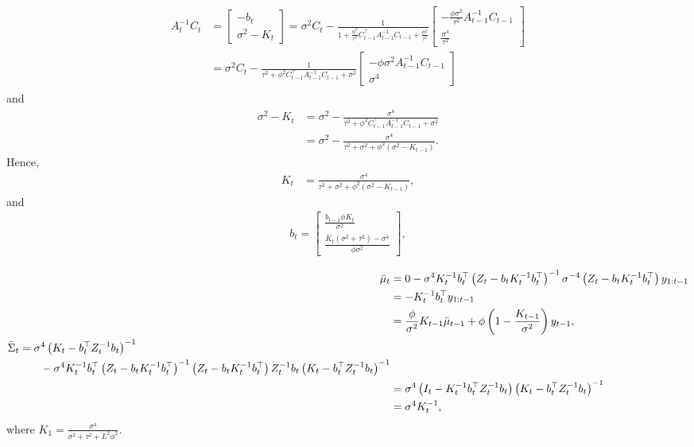 \begin{align}
\begin{split}
A_{t}^{-1}C_{t} &= \left[ \begin{array}{c} -b_{t} \\ \sigma^2-K_{t}\end{array} \right] = \sigma^2C_{t}-\frac{1}{1+\frac{\phi^2}{\tau^2} C_{t-1}^\top A_{t-1}^{-1}C_{t-1}+\frac{\sigma^2}{\tau^2}} \left[\begin{array}{c} -\frac{\phi\sigma^2}{\tau^2} A_{t-1}^{-1}C_{t-1} \\\frac{\sigma^4}{\tau^2} \end{array}\right] \\
&= \sigma^2C_{t}-\frac{1}{\tau^2+\phi^2C_{t-1}^\top A_{t-1}^{-1}C_{t-1}+\sigma^2} \left[\begin{array}{c} -\phi\sigma^2 A_{t-1}^{-1}C_{t-1} \\ \sigma^4 \end{array}\right]
\end{split}
\end{align}
and
\begin{align*}
\sigma^2-K_{t} &= \sigma^2 - \frac{\sigma^4}{\tau^2+\phi^2C_{t-1}^\top A_{t-1}^{-1}C_{t-1}+\sigma^2} \\
&= \sigma^2 - \frac{\sigma^4}{\tau^2+ \sigma^2 + \phi^2\left(\sigma^2-K_{t-1}\right)}.
\end{align*}
Hence, 
\begin{align}
K_{t}  &=\frac{\sigma^4}{\tau^2+\sigma^2+\phi^2\left(\sigma^2-K_{t-1}\right)},
\end{align}
and
\begin{align*}b_{t} = 
\begin{bmatrix}
\frac{b_{t-1}\phi K_{t}}{\sigma^2} \\ \frac{K_{t}\left(\sigma^2+\tau^2\right)-\sigma^4 }{\phi\sigma^2}
\end{bmatrix},
\end{align*}

\begin{align*}
\bar{\mu}_{t}      &= 0-\sigma^4 K_t^{-1}b_t^\top \left(Z_t-b_tK_t^{-1}b_t^\top\right)^{-1} \sigma^{-4} \left(Z_t-b_tK_t^{-1}b_t^\top\right) y_{1:t-1} \\
					 & =-K_t^{-1}b_t^\top y_{1:t-1} \\
					 & = \frac{\phi}{\sigma^2}K_{t-1}\bar{\mu}_{t-1} + \phi \left(1 - \frac{K_{t-1}}{\sigma^2}\right)y_{t-1}, \\
\begin{split}
\bar{\Sigma}_{t} &= \sigma^4\left(K_t-b_t^\top Z_t^{-1}b_t\right)^{-1}\\ 
&\hphantom{+t-} - \sigma^4K_t^{-1}b_t^\top \left(Z_t-b_tK_t^{-1}b_t^\top\right)^{-1} 
 \left(Z_t-b_tK_t^{-1}b_t^\top\right)Z_t^{-1}b_t\left(K_t-b_t^\top Z_t^{-1}b_t\right)^{-1}
\end{split}
\\  & = \sigma^4\left(I_t-K_t^{-1}b_t^\top Z_t^{-1}b_t\right)\left(K_t-b_t^\top Z_t^{-1}b_t\right)^{-1} \\
                     & = \sigma^4K_{t}^{-1},
\end{align*}
where $K_1=\frac{\sigma^4}{\sigma^2+\tau^2+L^2\phi^2}$.



